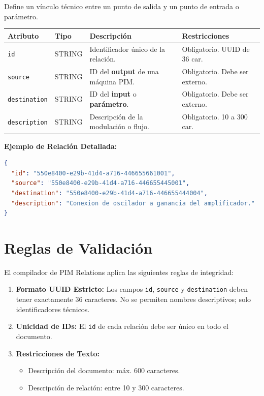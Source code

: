 Define un vínculo técnico entre un punto de salida y un punto de entrada o parámetro.

\begin{table}[H]
\centering
\small
\begin{tabular}{@{}llp{4cm}l@{}}
\toprule
Atributo & Tipo & Descripción & Restricciones \\ \midrule
\texttt{id} & STRING & Identificador único de la relación. & Obligatorio. UUID de 36 car. \\
\texttt{source} & STRING & ID del \textbf{output} de una máquina PIM. & Obligatorio. Debe ser externo. \\
\texttt{destination} & STRING & ID del \textbf{input} o \textbf{parámetro}. & Obligatorio. Debe ser externo. \\
\texttt{description} & STRING & Descripción de la modulación o flujo. & Obligatorio. 10 a 300 car. \\ \bottomrule
\end{tabular}
\end{table}

\textbf{Ejemplo de Relación Detallada:}
\begin{lstlisting}[language=json]
{
  "id": "550e8400-e29b-41d4-a716-446655661001",
  "source": "550e8400-e29b-41d4-a716-446655445001",
  "destination": "550e8400-e29b-41d4-a716-446655444004",
  "description": "Conexion de oscilador a ganancia del amplificador."
}
\end{lstlisting}

\section{Reglas de Validación}

El compilador de PIM Relations aplica las siguientes reglas de integridad:

\begin{enumerate}
    \item \textbf{Formato UUID Estricto:} Los campos \texttt{id}, \texttt{source} y \texttt{destination} deben tener exactamente 36 caracteres. No se permiten nombres descriptivos; solo identificadores técnicos.
    \item \textbf{Unicidad de IDs:} El \texttt{id} de cada relación debe ser único en todo el documento.
    \item \textbf{Restricciones de Texto:}
    \begin{itemize}
        \item Descripción del documento: máx. 600 caracteres.
        \item Descripción de relación: entre 10 y 300 caracteres.
    \end{itemize}
\end{enumerate}

